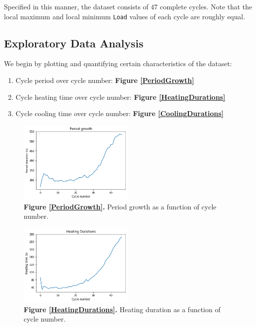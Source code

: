 \documentclass[letterpaper, 10 pt, conference]{ieeeconf}  %
\begin{document}
Specified in this manner, the dataset consists of $47$ complete cycles. Note that the local maximum and local minimum \verb|Load| values of each cycle are roughly equal.

\subsection{Exploratory Data Analysis}

We begin by plotting and quantifying certain characteristics of the dataset:
\begin{enumerate}
\itemsep0em 
\item Cycle period over cycle number:  \textbf{Figure \ref{PeriodGrowth}}
\item Cycle heating time over cycle number: \textbf{Figure \ref{HeatingDurations}}
\item Cycle cooling time over cycle number: \textbf{Figure \ref{CoolingDurations}}

\end{enumerate}


\label{PeriodGrowth}
\begin{figure}[h]
	\centering
	\includegraphics[width=0.5\textwidth]{assets/period_growth.png}
    \caption{\textbf{Figure \ref{PeriodGrowth}.} Period growth as a function of cycle number.}
\end{figure}

\label{HeatingDurations}
\begin{figure}[h]
	\centering
	\includegraphics[width=0.5\textwidth]{assets/heating_durations.png}
    \caption{\textbf{Figure \ref{HeatingDurations}.} Heating duration as a function of cycle number.}
\end{figure}
\end{document}
